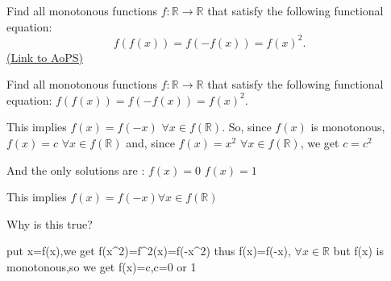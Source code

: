 \begin{problem}
	Find all monotonous functions $ f: \mathbb{R} \to \mathbb{R}$ that satisfy the following functional equation:
\[f(f(x)) = f( - f(x)) = f(x)^2.\]
	\flushright \href{https://artofproblemsolving.com/community/c6h257007}{(Link to AoPS)}
\end{problem}



\begin{solution}
	\begin{tcolorbox}Find all monotonous functions $ f: \mathbb{R} \to \mathbb{R}$ that satisfy the following functional equation:
$ f(f(x)) = f( - f(x)) = f(x)^2.$\end{tcolorbox}

This implies $ f(x)=f(-x)$ $ \forall x\in f(\mathbb R)$. So, since $ f(x)$ is monotonous, $ f(x)=c$ $ \forall x\in f(\mathbb R)$ and, since $ f(x)=x^2$ $ \forall x\in f(\mathbb R)$, we get $ c=c^2$

And the only solutions are :
$ f(x)=0$
$ f(x)=1$
\end{solution}



\begin{solution}
	\begin{tcolorbox}This implies $ f(x) = f( - x) \forall x\in f(\mathbb R)$\end{tcolorbox}

Why is this true?
\end{solution}



\begin{solution}
	put x=f(x),we get f(x^2)=f^2(x)=f(-x^2) 
thus f(x)=f(-x), $ \forall x\in \mathbb{R}$
but f(x) is monotonous,so we get f(x)=c,c=0 or 1
\end{solution}






